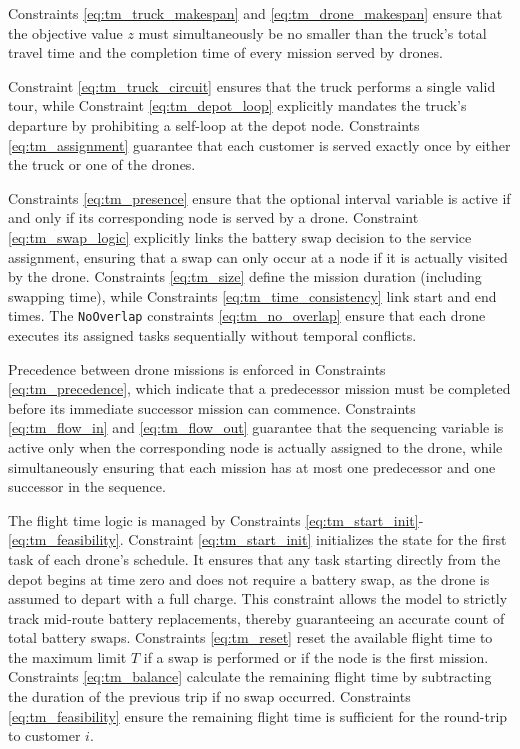 \documentclass[3p, authoryear, 11pt]{elsarticle}
\begin{document}
Constraints \eqref{eq:tm_truck_makespan} and \eqref{eq:tm_drone_makespan} ensure that the objective value $z$ must simultaneously be no smaller than the truck's total travel time and the completion time of every mission served by drones.

Constraint \eqref{eq:tm_truck_circuit} ensures that the truck performs a single valid tour, while Constraint \eqref{eq:tm_depot_loop} explicitly mandates the truck's departure by prohibiting a self-loop at the depot node. Constraints \eqref{eq:tm_assignment} guarantee that each customer is served exactly once by either the truck or one of the drones.

Constraints \eqref{eq:tm_presence} ensure that the optional interval variable is active if and only if its corresponding node is served by a drone. Constraint \eqref{eq:tm_swap_logic} explicitly links the battery swap decision to the service assignment, ensuring that a swap can only occur at a node if it is actually visited by the drone. Constraints \eqref{eq:tm_size} define the mission duration (including swapping time), while Constraints \eqref{eq:tm_time_consistency} link start and end times. The \texttt{NoOverlap} constraints \eqref{eq:tm_no_overlap} ensure that each drone executes its assigned tasks sequentially without temporal conflicts.

Precedence between drone missions is enforced in Constraints \eqref{eq:tm_precedence}, which indicate that a predecessor mission must be completed before its immediate successor mission can commence. Constraints \eqref{eq:tm_flow_in} and \eqref{eq:tm_flow_out} guarantee that the sequencing variable is active only when the corresponding node is actually assigned to the drone, while simultaneously ensuring that each mission has at most one predecessor and one successor in the sequence.

The flight time logic is managed by Constraints \eqref{eq:tm_start_init}-\eqref{eq:tm_feasibility}. Constraint \eqref{eq:tm_start_init} initializes the state for the first task of each drone's schedule. It ensures that any task starting directly from the depot begins at time zero and does not require a battery swap, as the drone is assumed to depart with a full charge. This constraint allows the model to strictly track mid-route battery replacements, thereby guaranteeing an accurate count of total battery swaps. Constraints \eqref{eq:tm_reset} reset the available flight time to the maximum limit $T$ if a swap is performed or if the node is the first mission. Constraints \eqref{eq:tm_balance} calculate the remaining flight time by subtracting the duration of the previous trip if no swap occurred. Constraints \eqref{eq:tm_feasibility} ensure the remaining flight time is sufficient for the round-trip to customer $i$.
\end{document}
